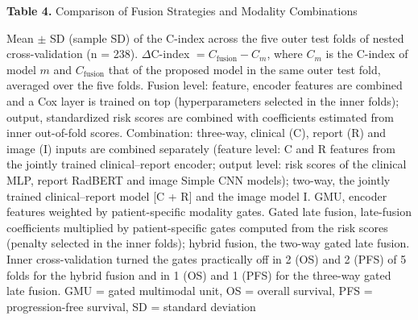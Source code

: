 \documentclass[border=8pt]{standalone}
\newif\ifshowtitle \showtitletrue
\newif\ifshownotes \shownotestrue
\begin{document}
\sbox{}%
\begin{minipage}{\wd\tablebox}
\ifshowtitle\noindent \textbf{Table 4.} Comparison of Fusion Strategies and Modality Combinations\par\vspace{4pt}\fi
\noindent\usebox\tablebox
\ifshownotes\par\vspace{3pt}\footnotesize\noindent Mean $\pm$ SD (sample SD) of the C-index across the five outer test folds of nested cross-validation (n = 238). $\Delta$C-index $= C_{\mathrm{fusion}} - C_{m}$, where $C_{m}$ is the C-index of model $m$ and $C_{\mathrm{fusion}}$ that of the proposed model in the same outer test fold, averaged over the five folds. Fusion level: feature, encoder features are combined and a Cox layer is trained on top (hyperparameters selected in the inner folds); output, standardized risk scores are combined with coefficients estimated from inner out-of-fold scores. Combination: three-way, clinical (C), report (R) and image (I) inputs are combined separately (feature level: C and R features from the jointly trained clinical--report encoder; output level: risk scores of the clinical MLP, report RadBERT and image Simple CNN models); two-way, the jointly trained clinical--report model [C + R] and the image model I. GMU, encoder features weighted by patient-specific modality gates. Gated late fusion, late-fusion coefficients multiplied by patient-specific gates computed from the risk scores (penalty selected in the inner folds); hybrid fusion, the two-way gated late fusion. Inner cross-validation turned the gates practically off in 2 (OS) and 2 (PFS) of 5 folds for the hybrid fusion and in 1 (OS) and 1 (PFS) for the three-way gated late fusion. GMU = gated multimodal unit, OS = overall survival, PFS = progression-free survival, SD = standard deviation\par\fi
\end{minipage}
\end{document}
